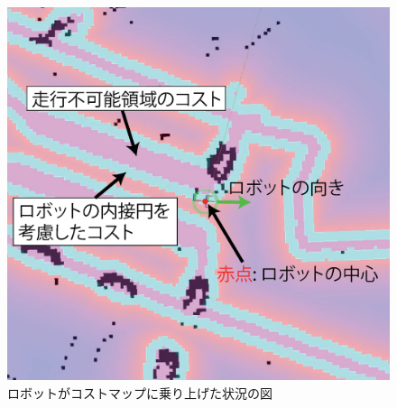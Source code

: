 \begin{figure}[h]
  \begin{center}
  	\includegraphics[width=0.9\linewidth]{figs/mugimaru_result.eps}
  	\caption{ロボットがコストマップに乗り上げた状況の図} 
  	\label{fig:mugimaru_result}
  \end{center}
\end{figure}

